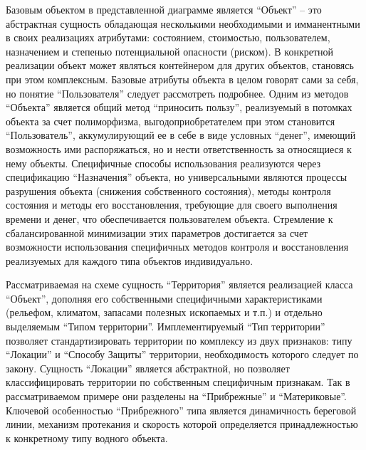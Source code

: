Базовым объектом в представленной диаграмме является \enquote{Объект} -- это абстрактная сущность обладающая несколькими необходимыми и имманентными в своих реализациях атрибутами: состоянием, стоимостью, пользователем, назначением и степенью потенциальной опасности (риском).
В конкретной реализации объект может являться контейнером для других объектов, становясь при этом комплексным.
Базовые атрибуты объекта в целом говорят сами за себя, но понятие \enquote{Пользователя} следует рассмотреть подробнее.
Одним из методов \enquote{Объекта} является общий метод \enquote{приносить пользу}, реализуемый в потомках объекта за счет полиморфизма, выгодоприобретателем при этом становится \enquote{Пользователь}, аккумулирующий ее в себе в виде условных \enquote{денег}, имеющий возможность ими распоряжаться, но и нести ответственность за относящиеся к нему объекты.
Специфичные способы использования реализуются через спецификацию \enquote{Назначения} объекта, но универсальными являются процессы разрушения объекта (снижения собственного состояния), методы контроля состояния и методы его восстановления, требующие для своего выполнения времени и денег, что обеспечивается пользователем объекта.
Стремление к сбалансированной минимизации этих параметров достигается за счет возможности использования специфичных методов контроля и восстановления реализуемых для каждого типа объектов индивидуально.


Рассматриваемая на схеме сущность \enquote{Территория} является реализацией класса \enquote{Объект}, дополняя его собственными специфичными характеристиками (рельефом, климатом, запасами полезных ископаемых и т.п.) и отдельно выделяемым \enquote{Типом территории}.
Имплементируемый \enquote{Тип территории} позволяет стандартизировать территории по комплексу из двух признаков: типу \enquote{Локации} и \enquote{Способу Защиты} территории, необходимость которого следует по закону.
Сущность \enquote{Локации} является абстрактной, но позволяет классифицировать территории по собственным специфичным признакам.
Так в рассматриваемом примере они разделены на \enquote{Прибрежные} и \enquote{Материковые}.
Ключевой особенностью \enquote{Прибрежного} типа является динамичность береговой линии, механизм протекания и скорость которой определяется принадлежностью к конкретному типу водного объекта.

